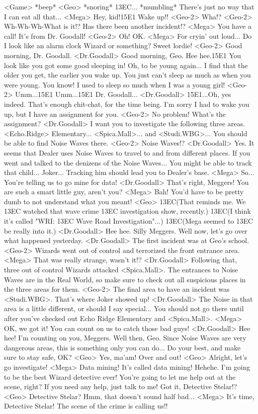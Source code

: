 <Game> *beep* 
<Geo> *snoring* 
{13}{EC}... 
*mumbling* 
There's just no way that I can eat all that... 
<Mega> Hey, kid!{15}{E1} Wake up!! 
<Geo-2> Wha!? 
<Geo-2> Wh-Wh-Wh-What is it!? 
Has there been another incident!? 
<Mega> You have a call! 
It's from Dr. Goodall! 
<Geo-2> Oh! OK. 
<Mega> For cryin' out loud... Do I look like an alarm clock Wizard or something? 
Sweet lordie! 
<Geo-2> Good morning, Dr. Goodall. 
<Dr.Goodall> Good morning, Geo. 
Hee hee.{15}{E1} You look like you got some good sleeping in! 
Oh, to be young again... 
I find that the older you get, the earlier you wake up. 
You just can't sleep as much as when you were young. 
You know! 
I used to sleep so much when I was a young girl! 
<Geo-2> Umm...{15}{E1} Umm...{15}{E1} Dr. Goodall... 
<Dr.Goodall> {15}{E1}...Oh, yes indeed. 
That's enough chit-chat, for the time being. 
I'm sorry I had to wake you up, but I have an assignment for you. 
<Geo-2> No problem! What's the assignment? 
<Dr.Goodall> I want you to investigate the following three areas. 
<Echo.Ridge> Elementary... 
<Spica.Mall>... 
and <Studi.WBG>... 
You should be able to find Noise Waves there. 
<Geo-2> Noise Waves!? 
<Dr.Goodall> Yes. 
It seems that Dealer uses Noise Waves to travel to and from different places. 
If you went and talked to the denizens of the Noise Waves... 
You might be able to track that child... 
Joker... 
Tracking him should lead you to Dealer's base. 
<Mega> So... You're telling us to go mine for data! 
<Dr.Goodall> That's right, Meggers! 
You are such a smart little guy, aren't you? 
<Mega> Bah! You'd have to be pretty dumb to not understand what you meant! 
<Geo> {13}{EC}(That reminds me. We {13}{EC} watched that wave crime {13}{EC} investigation show, recently.) 
{13}{EC}(I think it's called "WRI:  {13}{EC} Wave Road Investigation"...) 
{13}{EC}(Mega seemed to {13}{EC} be really into it.) 
<Dr.Goodall> Hee hee. Silly Meggers. 
Well now, let's go over what happened yesterday. 
<Dr.Goodall> The first incident was at Geo's school. 
<Geo-2> Wizards went out of control and terrorized the front entrance area. 
<Mega> That was really strange, wasn't it!? 
<Dr.Goodall> Following that, three out of control Wizards attacked <Spica.Mall>. 
The entrances to Noise Waves are in the Real World, 
so make sure to check out all suspicious places in the three areas for them. 
<Geo-2> The final area to have an incident was <Studi.WBG>. 
That's where Joker showed up! 
<Dr.Goodall> The Noise in that area is a little different, or should I say special... 
You should not go there until after you've checked 
out Echo Ridge Elementary and <Spica.Mall>. 
<Mega> OK, we got it! You can count on us to catch those bad guys! 
<Dr.Goodall> Hee hee! I'm counting on you, Meggers. 
Well then, Geo. 
Since Noise Waves are very dangerous areas, this is something only you can do... 
Do your best, and make sure to stay safe, OK? 
<Geo> Yes, ma'am! Over and out! 
<Geo> Alright, let's go investigate! 
<Mega> Data mining! It's called data mining! 
Hehehe. I'm going to be the best Wizard detective ever! 
You're going to let me help out at the scene, right? 
If you need any help, just talk to me! 
Got it, Detective Stelar!? 
<Geo> Detective Stelar? 
Hmm, that doesn't sound half bad... 
<Mega> It's time, Detective Stelar! The scene of the crime is calling us!! 
